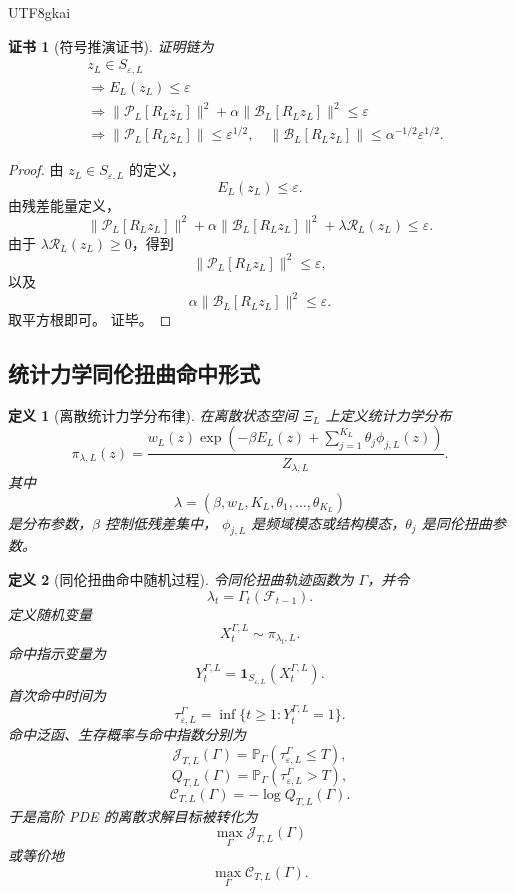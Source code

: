 \documentclass[12pt]{article}
\newtheorem{definition}{定义}[section]
\newtheorem{Certificate}{证书}[section]
\begin{document}
\begin{CJK*}{UTF8}{gkai}
\begin{Certificate}[符号推演证书]
\label{cert:tex55-pde-low-residual-controlled}
证明链为
\[
\begin{aligned}
  &z_L\in S_{\varepsilon,L}\\
  &\Longrightarrow
  E_L(z_L)\le\varepsilon\\
  &\Longrightarrow
  \lVert\mathcal P_L[R_Lz_L]\rVert^2
  +
  \alpha\lVert\mathcal B_L[R_Lz_L]\rVert^2
  \le\varepsilon\\
  &\Longrightarrow
  \lVert\mathcal P_L[R_Lz_L]\rVert\le\varepsilon^{1/2},
  \quad
  \lVert\mathcal B_L[R_Lz_L]\rVert\le\alpha^{-1/2}\varepsilon^{1/2}.
\end{aligned}
\]
\end{Certificate}

\begin{proof}
由 \(z_L\in S_{\varepsilon,L}\) 的定义，
\[
  E_L(z_L)\le\varepsilon.
\]
由残差能量定义，
\[
  \lVert\mathcal P_L[R_Lz_L]\rVert^2
  +
  \alpha
  \lVert\mathcal B_L[R_Lz_L]\rVert^2
  +
  \lambda\mathcal R_L(z_L)
  \le
  \varepsilon.
\]
由于 \(\lambda\mathcal R_L(z_L)\ge0\)，得到
\[
  \lVert\mathcal P_L[R_Lz_L]\rVert^2
  \le
  \varepsilon,
\]
以及
\[
  \alpha\lVert\mathcal B_L[R_Lz_L]\rVert^2
  \le
  \varepsilon.
\]
取平方根即可。
证毕。
\end{proof}

\subsection{统计力学同伦扭曲命中形式}
\label{subsec:tex55-pde-statistical-hit}

\begin{definition}[离散统计力学分布律]
\label{def:tex55-pde-statistical-law}
在离散状态空间 \(\Xi_L\) 上定义统计力学分布
\[
  \pi_{\lambda,L}(z)
  =
  \frac{
  w_L(z)
  \exp\left(
  -\beta E_L(z)
  +
  \sum_{j=1}^{K_L}\theta_j\phi_{j,L}(z)
  \right)
  }{
  Z_{\lambda,L}
  }.
\]
其中
\[
  \lambda=(\beta,w_L,K_L,\theta_1,\ldots,\theta_{K_L})
\]
是分布参数，\(\beta\) 控制低残差集中，
\(\phi_{j,L}\) 是频域模态或结构模态，\(\theta_j\) 是同伦扭曲参数。
\end{definition}

\begin{definition}[同伦扭曲命中随机过程]
\label{def:tex55-pde-homotopy-hit-process}
令同伦扭曲轨迹函数为 \(\Gamma\)，并令
\[
  \lambda_t=\Gamma_t(\mathcal F_{t-1}).
\]
定义随机变量
\[
  X_t^{\Gamma,L}\sim\pi_{\lambda_t,L}.
\]
命中指示变量为
\[
  Y_t^{\Gamma,L}
  =
  \mathbf 1_{S_{\varepsilon,L}}(X_t^{\Gamma,L}).
\]
首次命中时间为
\[
  \tau_{\varepsilon,L}^{\Gamma}
  =
  \inf\{t\ge1:Y_t^{\Gamma,L}=1\}.
\]
命中泛函、生存概率与命中指数分别为
\[
  \mathcal J_{T,L}(\Gamma)
  =
  \mathbb P_\Gamma(\tau_{\varepsilon,L}^{\Gamma}\le T),
\]
\[
  Q_{T,L}(\Gamma)
  =
  \mathbb P_\Gamma(\tau_{\varepsilon,L}^{\Gamma}>T),
\]
\[
  \mathcal C_{T,L}(\Gamma)
  =
  -\log Q_{T,L}(\Gamma).
\]
于是高阶 PDE 的离散求解目标被转化为
\[
  \boxed{
  \max_\Gamma\mathcal J_{T,L}(\Gamma)
  }
\]
或等价地
\[
  \boxed{
  \max_\Gamma\mathcal C_{T,L}(\Gamma).
  }
\]
\end{definition}


\end{CJK*}
\end{document}
